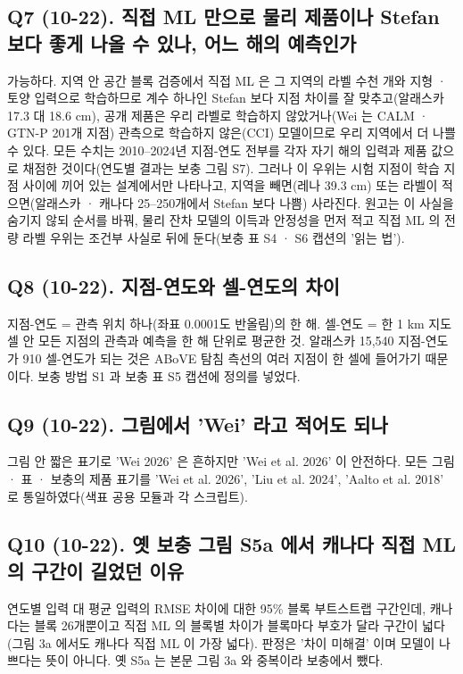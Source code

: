 \documentclass[10pt,a4paper]{article}
\begin{document}
\subsection*{Q7 (10-22). 직접 ML 만으로 물리 제품이나 Stefan 보다 좋게 나올 수 있나, 어느 해의 예측인가}
가능하다. 지역 안 공간 블록 검증에서 직접 ML 은 그 지역의 라벨 수천 개와 지형 · 토양 입력으로 학습하므로 계수 하나인 Stefan 보다 지점 차이를 잘 맞추고(알래스카 17.3 대 18.6 cm), 공개 제품은 우리 라벨로 학습하지 않았거나(Wei 는 CALM · GTN-P 201개 지점) 관측으로 학습하지 않은(CCI) 모델이므로 우리 지역에서 더 나쁠 수 있다. 모든 수치는 2010--2024년 지점-연도 전부를 각자 자기 해의 입력과 제품 값으로 채점한 것이다(연도별 결과는 보충 그림 S7). 그러나 이 우위는 시험 지점이 학습 지점 사이에 끼어 있는 설계에서만 나타나고, 지역을 빼면(레나 39.3 cm) 또는 라벨이 적으면(알래스카 · 캐나다 25--250개에서 Stefan 보다 나쁨) 사라진다. 원고는 이 사실을 숨기지 않되 순서를 바꿔, 물리 잔차 모델의 이득과 안정성을 먼저 적고 직접 ML 의 전량 라벨 우위는 조건부 사실로 뒤에 둔다(보충 표 S4 · S6 캡션의 '읽는 법').

\subsection*{Q8 (10-22). 지점-연도와 셀-연도의 차이}
지점-연도 = 관측 위치 하나(좌표 0.0001도 반올림)의 한 해. 셀-연도 = 한 1 km 지도 셀 안 모든 지점의 관측과 예측을 한 해 단위로 평균한 것. 알래스카 15,540 지점-연도가 910 셀-연도가 되는 것은 ABoVE 탐침 측선의 여러 지점이 한 셀에 들어가기 때문이다. 보충 방법 S1 과 보충 표 S5 캡션에 정의를 넣었다.

\subsection*{Q9 (10-22). 그림에서 'Wei' 라고 적어도 되나}
그림 안 짧은 표기로 'Wei 2026' 은 흔하지만 'Wei et al. 2026' 이 안전하다. 모든 그림 · 표 · 보충의 제품 표기를 'Wei et al. 2026', 'Liu et al. 2024', 'Aalto et al. 2018' 로 통일하였다(색표 공용 모듈과 각 스크립트).

\subsection*{Q10 (10-22). 옛 보충 그림 S5a 에서 캐나다 직접 ML 의 구간이 길었던 이유}
연도별 입력 대 평균 입력의 RMSE 차이에 대한 95\% 블록 부트스트랩 구간인데, 캐나다는 블록 26개뿐이고 직접 ML 의 블록별 차이가 블록마다 부호가 달라 구간이 넓다(그림 3a 에서도 캐나다 직접 ML 이 가장 넓다). 판정은 '차이 미해결' 이며 모델이 나쁘다는 뜻이 아니다. 옛 S5a 는 본문 그림 3a 와 중복이라 보충에서 뺐다.
\end{document}

